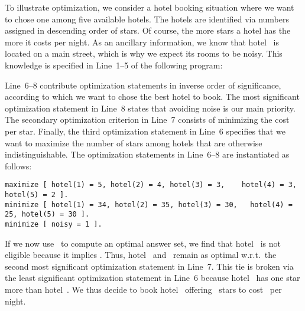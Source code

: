\begin{example}\label{ex:opt}
To illustrate optimization, we consider a hotel booking situation
where we want to chose one among five available hotels.
The hotels are identified via numbers assigned in descending order of stars.
Of course, the more stars a hotel has the more it costs per night.
As an ancillary information, we know that hotel~ is located
on a main street, which is why we expect its rooms to be noisy.
This knowledge is specified in Line~1--5 of the following program:
%

%
Line~6--8 contribute optimization statements in inverse order of significance,
according to which we want to chose the best hotel to book.
The most significant optimization statement in Line~8 states that
avoiding noise is our main priority.
The secondary optimization criterion in Line~7 consists of
minimizing the cost per star.
Finally, the third optimization statement in Line~6 specifies that we want
to maximize the number of stars among hotels that are otherwise indistinguishable.
The optimization statements in Line~6--8 are instantiated as follows:%
%
\begin{lstlisting}[firstnumber=6,breaklines,breakindent=48pt]
maximize [ hotel(1) = 5, hotel(2) = 4, hotel(3) = 3,    hotel(4) = 3, hotel(5) = 2 ].
minimize [ hotel(1) = 34, hotel(2) = 35, hotel(3) = 30,   hotel(4) = 25, hotel(5) = 30 ].
minimize [ noisy = 1 ].
\end{lstlisting}
If we now use \clasp\ to compute an optimal answer set,%
we find that hotel~ is not eligible because it implies .
Thus, hotel~ and~ remain as optimal w.r.t.\ the second most
significant optimization statement in Line~7.
This tie is broken via the least significant optimization statement in Line~6
because hotel~ has one star more than hotel~.
We thus decide to book hotel~ offering~ stars
to cost~ per night.
\eexample
\end{example}


